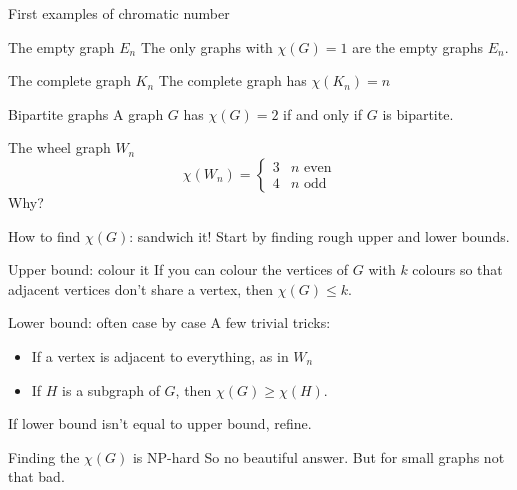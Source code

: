 \documentclass{beamer}
\begin{document}
\begin{frame}{First examples of chromatic number}
\begin{block}{The empty graph $E_n$}
The only graphs with $\chi(G)=1$ are the empty graphs $E_n$.
\end{block}
\begin{block}{The complete graph $K_n$}
The complete graph has $\chi(K_n)=n$
\end{block}

\begin{block}{Bipartite graphs}
A graph $G$ has $\chi(G)=2$ if and only if $G$ is bipartite.
\end{block}
\begin{block}{The wheel graph $W_n$}
$$\chi(W_n)=\begin{cases} 3 & n \text{ even} \\
4 & n \text{ odd}
\end{cases}$$
Why?
\end{block}

\end{frame}

\begin{frame}{How to find $\chi(G)$: sandwich it!}
Start by finding rough upper and lower bounds.

  \begin{block}{Upper bound: colour it}
If you can colour the vertices of $G$ with $k$ colours so that adjacent vertices don't share a vertex, then $\chi(G)\leq k$.
  \end{block}


  \begin{block}{Lower bound: often case by case}
    A few trivial tricks:
    \begin{itemize}
      \item If a vertex is adjacent to everything, as in $W_n$
      \item If $H$ is a subgraph of $G$, then $\chi(G)\geq \chi(H)$.
    \end{itemize}
    
    \end{block}
If lower bound isn't equal to upper bound, refine.  
\begin{block}{Finding the $\chi(G)$ is NP-hard}
So no beautiful answer.  But for small graphs not that bad.
  \end{block}

 \end{frame}
\end{document}
